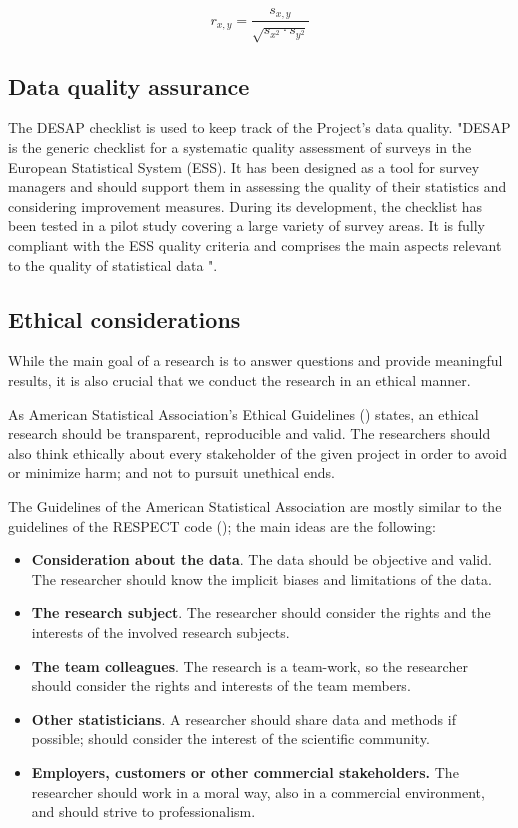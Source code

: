 \documentclass[12pt,a4paper,paper=a4,oneside,titlepage,pdftex]{scrartcl}
\begin{document}
\begin{equation}
r_{x,y} = \frac{s_{x,y}}{\sqrt{s_{x^2} \cdot s_{y^2}}}
\label{eq:correlation}
\end{equation}

\subsection{Data quality assurance}
The DESAP checklist is used to keep track of the Project's data quality. "DESAP  is  the  generic  checklist  for  a  systematic  quality  assessment  of  surveys  in  the  European Statistical  System  (ESS).  It  has  been  designed  as  a  tool  for  survey  managers  and  should  support them  in  assessing  the  quality  of  their  statistics  and  considering  improvement  measures.  During  its development, the checklist has been tested in a pilot study covering a large variety of survey areas. It is fully compliant with the ESS quality criteria and comprises the main aspects relevant to the quality of  statistical  data \citep{desap2019}".

\subsection{Ethical considerations} 
While the main goal of a research is to answer questions and provide meaningful results, it is also crucial that we conduct the research in an ethical manner. 

As American Statistical Association’s Ethical Guidelines (\citep{asa}) states, an ethical research should be transparent, reproducible and valid. The researchers should also think ethically about every stakeholder of the given project in order to avoid or minimize harm; and not to pursuit unethical ends. 

The Guidelines of the American Statistical Association are mostly similar to the guidelines of the RESPECT code (\citep{respect}); the main ideas are the following:

\begin{itemize}
	\item \textbf{Consideration about the data}. The data should be objective and valid. The researcher should know the implicit biases and limitations of the data.
	\item \textbf{The research subject}. The researcher should consider the rights and the interests of the involved research subjects.
	\item \textbf{The team colleagues}. The research is a team-work, so the researcher should consider the rights and interests of the team members.
	\item \textbf{Other statisticians}. A researcher should share data and methods if possible; should consider the interest of the scientific community.
	\item \textbf{Employers, customers or other commercial stakeholders.} The researcher should work in a moral way, also in a commercial environment, and should strive to professionalism.
\end{itemize}
\end{document}
